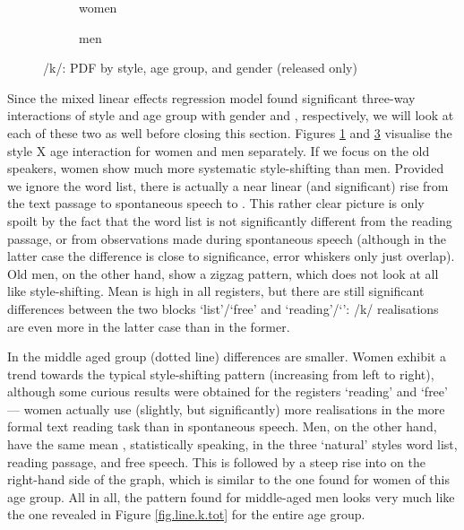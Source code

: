 \begin{figure}[h]
	\centering
	\begin{subfigure}{.49\textwidth}
		\centering
			\resizebox{\linewidth}{!}{} 
		\caption{women}
		\label{fig.line.k.fem}
	\end{subfigure}
	\begin{subfigure}{.49\textwidth}
		\centering
			\resizebox{\linewidth}{!}{} 
		\caption{men}
		\label{fig.line.k.mal}
	\end{subfigure}
	\caption{/k/: PDF by style, age group, and gender (released only)}
\end{figure}

Since the mixed linear effects regression model found significant three-way interactions of style and age group with gender and , respectively, we will look at each of these two as well before closing this section.
Figures \ref{fig.line.k.fem} and \ref{fig.line.k.mal} visualise the style X age interaction for women and men separately.
If we focus on the old speakers, women show much more systematic style-shifting than men.
Provided we ignore the word list, there is actually a near linear (and significant) rise from the text passage to spontaneous speech to .
This rather clear picture is only spoilt by the fact that the word list is not significantly different from the reading passage, or from observations made during spontaneous speech (although in the latter case the difference is close to significance, error whiskers only just overlap).
Old men, on the other hand, show a zigzag pattern, which does not look at all like  style-shifting.
Mean  is high in all registers, but there are still significant differences between the two blocks `list'/`free' and `reading'/`': /k/ realisations are even more  in the latter case than in the former.

In the middle aged group (dotted line) differences are smaller.
Women exhibit a trend towards the typical style-shifting pattern (increasing  from left to right), although some curious results were obtained for the registers `reading' and `free' --- women actually use (slightly, but significantly) more  realisations in the more formal text reading task than in spontaneous speech.
Men, on the other hand, have the same mean , statistically speaking, in the three `natural' styles word list, reading passage, and free speech.
This is followed by a steep rise into  on the right-hand side of the graph, which is similar to the one found for women of this age group.
All in all, the pattern found for middle-aged men looks very much like the one revealed in Figure \ref{fig.line.k.tot} for the entire age group.

